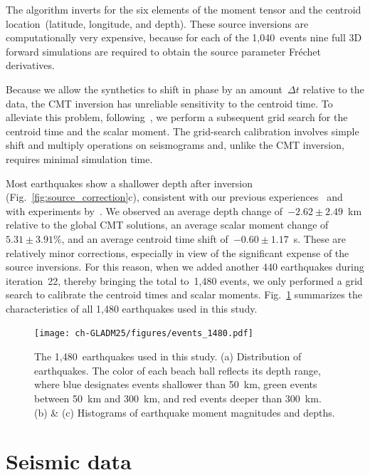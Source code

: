 The algorithm inverts for the six elements of the moment tensor
and the centroid location~(latitude, longitude, and depth).
These source inversions are computationally very expensive,
because for each of the 1,040~events nine full 3D forward simulations are required to obtain the source parameter Fr\'echet derivatives.

Because we allow the synthetics to shift in phase by an amount~$\Delta t$ relative to the data,
the CMT inversion has unreliable sensitivity to the centroid time.
To alleviate this problem,
following~\cite{zhu2012structure},
we perform a subsequent grid search for the centroid time and the scalar moment.
The grid-search calibration involves simple shift and multiply operations on seismograms
and, unlike the CMT inversion, requires minimal simulation time.

Most earthquakes show a shallower depth after inversion
(Fig.~\ref{fig:source_correction}c),
consistent with our previous experiences~\cite{zhu2015seismic,chen2015multiparameter,bozdaug2016global} and with experiments by~\cite{hjorleifsdottir2010effects}.
We observed an average depth change of~$-2.62\pm2.49$~km relative to the global CMT solutions,
an average scalar moment change of~$5.31\pm3.91$\%,
and an average centroid time shift of~$-0.60\pm1.17$~s.
These are relatively minor corrections, especially in view of the significant expense of the source inversions.
For this reason, when we added another 440 earthquakes during iteration~22,
thereby bringing the total to~1,480 events,
we only performed a grid search to calibrate the centroid times and scalar moments.
Fig.~\ref{fig:event_1480} summarizes the characteristics of all 1,480 earthquakes used in this study.

\begin{figure}
  \centering
  \texttt{[image: ch-GLADM25/figures/events\_1480.pdf]}
  \caption{\small{The 1,480~earthquakes used in this study. (a) Distribution of earthquakes. The color of each beach ball reflects its depth range, where blue designates events shallower than 50~km, green events between 50~km and 300~km, and red events deeper than 300~km. (b) \& (c) Histograms of earthquake moment magnitudes and depths.}}
  \label{fig:event_1480}
\end{figure}


\section{Seismic data}
\label{section:data}

